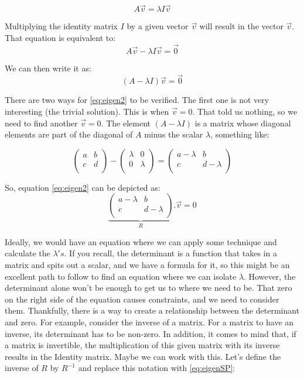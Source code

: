 \documentclass[a4,12pt,twosided,openany]{memoir}
\begin{document}
\[A\overrightarrow{v} = \lambda I \overrightarrow{v}\]
\par 
\indent
Multiplying the identity matrix $I$ by a given vector $\overrightarrow{v}$ will result in the vector $\overrightarrow{v}$. That equation is equivalent to:
\[A\overrightarrow{v} - \lambda I \overrightarrow{v} = \overrightarrow{0}\]
\par 
\indent
We can then write it as:
\begin{equation}\label{eq:eigen2}
(A - \lambda I)\overrightarrow{v} = \overrightarrow{0}
\end{equation}
\par 
\indent
There are two ways for \ref{eq:eigen2} to be verified. The first one is not very interesting (the trivial solution). This is when $\overrightarrow{v}=0$. That told us nothing, so we need to find another $\overrightarrow{v}=0$. The element $(A−\lambda I)$ is a matrix whose diagonal elements are part of the diagonal of $A$ minus the scalar  $\lambda$, something like:

\[\begin{pmatrix}
a & b \\
c & d \\
\end{pmatrix} - \begin{pmatrix}
\lambda & 0 \\
0 & \lambda \\
\end{pmatrix} = \begin{pmatrix}
a - \lambda & b \\
c & d - \lambda \\
\end{pmatrix}
\]
\par 
\indent
So, equation \ref{eq:eigen2} can be depicted as:
\begin{equation}\label{eq:eigenSP}
\underbrace{\begin{pmatrix}
a - \lambda & b \\
c & d - \lambda \\
\end{pmatrix}}_{R}. \overrightarrow{v} = 0
\end{equation}
\par 
\indent
Ideally, we would have an equation where we can apply some technique and calculate the $\lambda's$. If you recall, the determinant is a function that takes in a matrix and spits out a scalar, and we have a formula for it, so this might be an excellent path to follow to find an equation where we can isolate $\lambda$. However, the determinant alone won’t be enough to get us to where we need to be. That zero on the right side of the equation causes constraints, and we need to consider them. Thankfully, there is a way to create a relationship between the determinant and zero. For example, consider the inverse of a matrix. For a matrix to have an inverse, its determinant has to be non-zero. In addition, it comes to mind that, if a matrix is invertible, the multiplication of this given matrix with its inverse results in the Identity matrix. Maybe we can work with this. Let’s define the inverse of $R$ by $R^{−1}$ and replace this notation with \ref{eq:eigenSP}:
 
\end{document}

